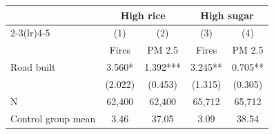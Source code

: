 {
\def\sym#1{\ifmmode^{#1}\else\(^{#1}\)\fi}
\begin{tabular}{l*{4}{c}}
\hline\hline
                         &\multicolumn{2}{c}{High rice}  &\multicolumn{2}{c}{High sugar} \\\cmidrule(lr){2-3}\cmidrule(lr){4-5}
                         &\multicolumn{1}{c}{(1)}&\multicolumn{1}{c}{(2)}&\multicolumn{1}{c}{(3)}&\multicolumn{1}{c}{(4)}\\
                         &\multicolumn{1}{c}{Fires}&\multicolumn{1}{c}{PM 2.5}&\multicolumn{1}{c}{Fires}&\multicolumn{1}{c}{PM 2.5}\\
\hline
Road built               &       3.560*  &       1.392***&       3.245** &       0.705** \\
                         &     (2.022)   &     (0.453)   &     (1.315)   &     (0.305)   \\
\hline
N                        &      62,400   &      62,400   &      65,712   &      65,712   \\
Control group mean       &        3.46   &       37.05   &        3.09   &       38.54   \\
\hline\hline
\end{tabular}
}
